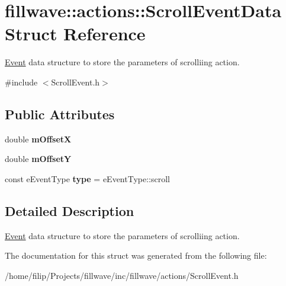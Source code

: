 \hypertarget{structfillwave_1_1actions_1_1ScrollEventData}{}\section{fillwave\+:\+:actions\+:\+:Scroll\+Event\+Data Struct Reference}
\label{structfillwave_1_1actions_1_1ScrollEventData}


\hyperlink{classfillwave_1_1actions_1_1Event}{Event} data structure to store the parameters of scrolliing action.  




{\ttfamily \#include $<$Scroll\+Event.\+h$>$}

\subsection*{Public Attributes}
\begin{DoxyCompactItemize}
\item 
\hypertarget{structfillwave_1_1actions_1_1ScrollEventData_a030a9fbe9b5333be967d6ee753c21144}{}double {\bfseries m\+Offset\+X}\label{structfillwave_1_1actions_1_1ScrollEventData_a030a9fbe9b5333be967d6ee753c21144}

\item 
\hypertarget{structfillwave_1_1actions_1_1ScrollEventData_aa0658af7bb6ccda82a7cc5f2b13cc2a9}{}double {\bfseries m\+Offset\+Y}\label{structfillwave_1_1actions_1_1ScrollEventData_aa0658af7bb6ccda82a7cc5f2b13cc2a9}

\item 
\hypertarget{structfillwave_1_1actions_1_1ScrollEventData_a516948e3d06b3f743c114d131a9d0ebe}{}const e\+Event\+Type {\bfseries type} = e\+Event\+Type\+::scroll\label{structfillwave_1_1actions_1_1ScrollEventData_a516948e3d06b3f743c114d131a9d0ebe}

\end{DoxyCompactItemize}


\subsection{Detailed Description}
\hyperlink{classfillwave_1_1actions_1_1Event}{Event} data structure to store the parameters of scrolliing action. 

The documentation for this struct was generated from the following file\+:\begin{DoxyCompactItemize}
\item 
/home/filip/\+Projects/fillwave/inc/fillwave/actions/Scroll\+Event.\+h\end{DoxyCompactItemize}
